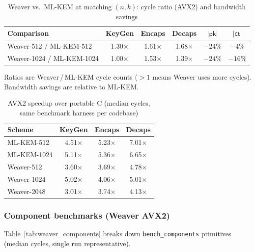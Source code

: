 \begin{table}[t]
\centering
\caption{Weaver vs.\ ML-KEM at matching $(n,k)$: cycle ratio (AVX2) and bandwidth savings}
\label{tab:weaver_vs_mlkem}
\begin{tabular}{lccccc}
\toprule
\textbf{Comparison} & \textbf{KeyGen} & \textbf{Encaps} & \textbf{Decaps} & $|\mathsf{pk}|$ & $|\mathsf{ct}|$ \\
\midrule
Weaver-512 / ML-KEM-512   & 1.30$\times$ & 1.61$\times$ & 1.68$\times$ & $-24\%$ & $-4\%$ \\
Weaver-1024 / ML-KEM-1024 & 1.00$\times$ & 1.53$\times$ & 1.39$\times$ & $-24\%$ & $-16\%$ \\
\bottomrule
\end{tabular}
\end{table}

\noindent
Ratios are Weaver\,/\,ML-KEM cycle counts ($>1$ means Weaver uses more cycles). Bandwidth savings are relative to ML-KEM.

\begin{table}[t]
\centering
\caption{AVX2 speedup over portable C (median cycles, same benchmark harness per codebase)}
\label{tab:avx_speedup}
\begin{tabular}{lccc}
\toprule
\textbf{Scheme} & \textbf{KeyGen} & \textbf{Encaps} & \textbf{Decaps} \\
\midrule
ML-KEM-512   & 4.51$\times$ & 5.23$\times$ & 7.01$\times$ \\
ML-KEM-1024  & 5.11$\times$ & 5.36$\times$ & 6.65$\times$ \\
Weaver-512   & 3.60$\times$ & 3.69$\times$ & 4.78$\times$ \\
Weaver-1024  & 5.02$\times$ & 4.06$\times$ & 5.01$\times$ \\
Weaver-2048  & 3.01$\times$ & 3.74$\times$ & 4.13$\times$ \\
\bottomrule
\end{tabular}
\end{table}

\subsubsection{Component benchmarks (Weaver AVX2)}
Table~\ref{tab:weaver_components} breaks down \texttt{bench\_components} primitives (median cycles, single run representative).


